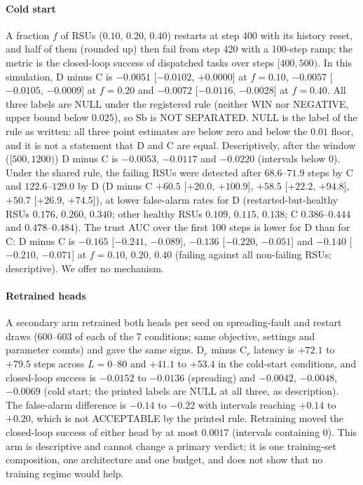 \paragraph*{Cold start}
A fraction $f$ of RSUs ($0.10$, $0.20$, $0.40$) restarts at step 400 with its history reset, and half of them (rounded up) then fail from step 420 with a 100-step ramp; the metric is the closed-loop success of dispatched tasks over steps $[400,500)$.
In this simulation, D minus C is $-0.0051$ [$-0.0102$, $+0.0000$] at $f=0.10$, $-0.0057$ [$-0.0105$, $-0.0009$] at $f=0.20$ and $-0.0072$ [$-0.0116$, $-0.0028$] at $f=0.40$.
All three labels are NULL under the registered rule (neither WIN nor NEGATIVE, upper bound below $0.025$), so Sb is NOT SEPARATED.
NULL is the label of the rule as written: all three point estimates are below zero and below the $0.01$ floor, and it is not a statement that D and C are equal.
Descriptively, after the window ($[500,1200)$) D minus C is $-0.0053$, $-0.0117$ and $-0.0220$ (intervals below $0$).
Under the shared rule, the failing RSUs were detected after $68.6$--$71.9$ steps by C and $122.6$--$129.0$ by D (D minus C $+60.5$ [$+20.0$, $+100.9$], $+58.5$ [$+22.2$, $+94.8$], $+50.7$ [$+26.9$, $+74.5$]), at lower false-alarm rates for D (restarted-but-healthy RSUs $0.176$, $0.260$, $0.340$; other healthy RSUs $0.109$, $0.115$, $0.138$; C $0.386$--$0.444$ and $0.478$--$0.484$).
The trust AUC over the first 100 steps is lower for D than for C: D minus C is $-0.165$ [$-0.241$, $-0.089$], $-0.136$ [$-0.220$, $-0.051$] and $-0.140$ [$-0.210$, $-0.071$] at $f=0.10$, $0.20$, $0.40$ (failing against all non-failing RSUs; descriptive).
We offer no mechanism.

\paragraph*{Retrained heads}
A secondary arm retrained both heads per seed on spreading-fault and restart draws (600--603 of each of the 7 conditions; same objective, settings and parameter counts) and gave the same signs.
D$_r$ minus C$_r$ latency is $+72.1$ to $+79.5$ steps across $L=0$--$80$ and $+41.1$ to $+53.4$ in the cold-start conditions, and closed-loop success is $-0.0152$ to $-0.0136$ (spreading) and $-0.0042$, $-0.0048$, $-0.0069$ (cold start; the printed labels are NULL at all three, as description).
The false-alarm difference is $-0.14$ to $-0.22$ with intervals reaching $+0.14$ to $+0.20$, which is not ACCEPTABLE by the printed rule.
Retraining moved the closed-loop success of either head by at most $0.0017$ (intervals containing $0$).
This arm is descriptive and cannot change a primary verdict; it is one training-set composition, one architecture and one budget, and does not show that no training regime would help.

